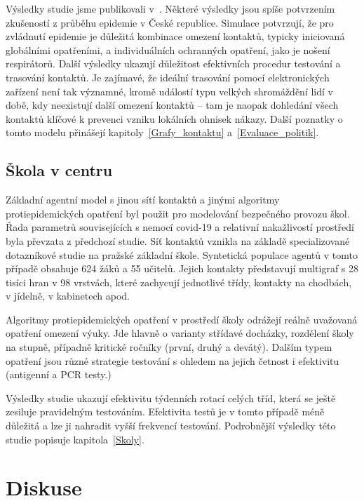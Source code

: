 Výsledky studie jsme publikovali v~\cite{model-m-medrxiv}. Některé výsledky jsou spíše potvrzením zkušeností z průběhu epidemie v České republice. Simulace potvrzují, že pro zvládnutí epidemie je důležitá kombinace omezení kontaktů, typicky iniciovaná globálními opatřeními, a individuálních ochranných opatření, jako je nošení respirátorů. Další výsledky ukazují důležitost efektivních procedur testování a trasování kontaktů. Je zajímavé, že ideální trasování pomocí elektronických zařízení není tak významné, kromě událostí typu velkých shromáždění lidí v době, kdy neexistují další omezení kontaktů -- tam je naopak dohledání všech kontaktů klíčové k prevenci vzniku lokálních ohnisek nákazy. Další poznatky o tomto modelu přinášejí kapitoly~\ref{Grafy_kontaktu}
a~\ref{Evaluace_politik}.


\subsection*{Škola v centru}

Základní agentní model s jinou sítí kontaktů a jinými algoritmy protiepidemických opatření byl použit pro modelování bezpečného provozu škol. Řada parametrů souvisejících s nemocí covid-19 a relativní nakažlivostí prostředí byla převzata z předchozí studie. Síť kontaktů vznikla na základě specializované dotazníkové studie na pražské základní škole. Syntetická populace agentů v tomto případě obsahuje 624 žáků a 55 učitelů. Jejich kontakty představují multigraf s 28 tisíci hran v 98 vrstvách, které zachycují jednotlivé třídy, kontakty na chodbách, v jídelně, v kabinetech apod. 

Algoritmy protiepidemických opatření v prostředí školy odrážejí reálně uvažovaná opatření omezení výuky. Jde hlavně o varianty střídavé docházky, rozdělení školy na stupně, případně kritické ročníky (první, druhý a devátý). Dalším typem opatření jsou různé strategie testování s ohledem na jejich četnost i efektivitu (antigenní a PCR testy.)

Výsledky studie ukazují efektivitu týdenních rotací celých tříd, která se ještě zesiluje pravidelným testováním. Efektivita testů je v tomto případě méně důležitá a lze ji nahradit vyšší frekvencí testování. Podrobnější výsledky této studie popisuje kapitola~\ref{Skoly}.







\section*{Diskuse} 

